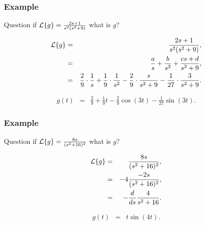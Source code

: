 \begin{frame}
  \frametitle{Example}

  \begin{block}{Question}
    if $\laplace{g}=\frac{2s+1}{s^2(s^2+9)}$ what is $g$?
  \end{block}

    {
      \begin{eqnarray*}
        \laplace{g} & = & \frac{2s+1}{s^2(s^2+9)}, \\
        & = & \frac{a}{s}+\frac{b}{s^2} + \frac{cs+d}{s^2+9}, \\
        & = & \frac{2}{9}\cdot\frac{1}{s} + \frac{1}{9}\cdot\frac{1}{s^2}-\frac{2}{9}\cdot\frac{s}{s^2+9}-\frac{1}{27}\cdot\frac{3}{s^2+9}.
      \end{eqnarray*}
    }

    {
      \begin{eqnarray*}
        g(t) & = & \frac{2}{9} + \frac{1}{9}t - \frac{2}{9}\cos(3t) - \frac{1}{27} \sin(3t).
      \end{eqnarray*}
    }
  

\end{frame}


\begin{frame}
  \frametitle{Example}

  \begin{block}{Question}
    if $\laplace{g}=\frac{8s}{(s^2+16)^2}$ what is $g$?
  \end{block}

    {
      \begin{eqnarray*}
        \laplace{g} & = & \frac{8s}{(s^2+16)^2}, \\
        & = & -4 \frac{-2s}{(s^2+16)^2}, \\
        & = & - \frac{d}{ds} \frac{4}{s^2+16}.
      \end{eqnarray*}
    }

    {
      \begin{eqnarray*}
        g(t) & = & t \sin(4t).
      \end{eqnarray*}
    }
  

\end{frame}

